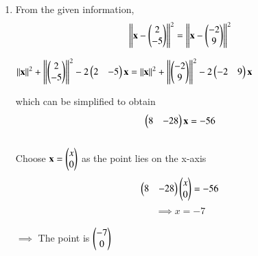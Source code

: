 \renewcommand{\theequation}{\theenumi}
\begin{enumerate}[label=\arabic*.,ref=\thesubsubsection.\theenumi]
%
\item From the given information, \\
$$\norm{\vec{x}-\myvec{2\\-5}}^2 = \norm{\vec{x}-\myvec{-2\\9}}^2$$

$\norm{\vec{x}}^2 + \norm{\myvec{2\\-5}}^2 -2\myvec{2 & -5}\vec{x} = \norm{\vec{x}}^2 + \norm{\myvec{-2\\9}}^2 -2\myvec{-2 & 9}\vec{x}$

which can be simplified to obtain
$$\myvec{8 & -28}\vec{x} = -56$$ \\
Choose $\vec{x} = \myvec{x\\0}$ as the point lies on the x-axis
$$\myvec{8 & -28}\myvec{x\\0} = -56$$
$$\implies x = -7$$ \\
$\implies$ The point is $\myvec{-7\\0}$  

\end{enumerate}

